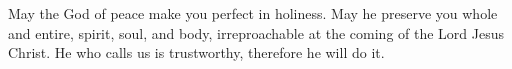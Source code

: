 
\lettrine{M}{}ay the God of peace make you perfect in holiness. May he preserve you whole and entire, spirit, soul, and body, irreproachable at the coming of the Lord Jesus Christ. He who calls us is trustworthy, therefore he will do it.